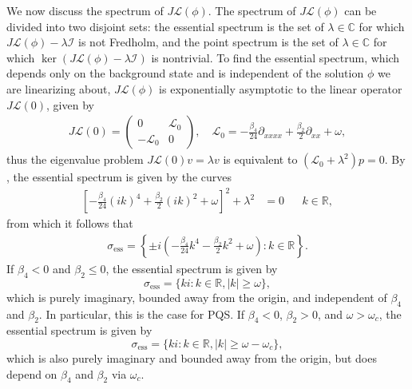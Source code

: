 \documentclass[12pt]{elsarticle}
\def\R{{\mathbb R}}
\def\C{{\mathbb C}}
\def\calL{{\mathcal L}}
\def\calI{{\mathcal I}}
\begin{document}
We now discuss the spectrum of $J \calL(\phi)$. The spectrum of $J \calL(\phi)$ can be divided into two disjoint sets: the essential spectrum is the set of $\lambda \in \C$ for which $J \calL(\phi) - \lambda \calI$ is not Fredholm, and the point spectrum is the set of $\lambda \in \C$ for which $\ker( J \calL(\phi) - \lambda \calI)$ is nontrivial. To find the essential spectrum, which depends only on the background state and is independent of the solution $\phi$ we are linearizing about, $J \calL(\phi)$ is exponentially asymptotic to the linear operator $J \calL(0)$, given by
\begin{align}\label{defL0}
J \calL(0) = 
\begin{pmatrix}
0 & \calL_0 \\
-\calL_0 & 0
\end{pmatrix}, \quad
\calL_0 = -\frac{\beta_4}{24} \partial_{xxxx} + \frac{\beta_2}{2} \partial_{xx} + \omega,
\end{align}
thus the eigenvalue problem $J \calL(0) v = \lambda v$ is equivalent to $(\calL_0 + \lambda^2)p = 0$. By \cite[Theorem 3.1.13]{Kapitula2013}, the essential spectrum is given by the curves
\begin{align*}
\left[ -\frac{\beta_4}{24} (ik)^4 + \frac{\beta_2}{2}(ik)^2 + \omega \right]^2 + \lambda^2 &= 0 && k \in \R,
\end{align*}
from which it follows that
\begin{align*}
\sigma_{\text{ess}} = \left\{ \pm i \left( -\frac{\beta_4}{24}k^4 - \frac{\beta_2}{2}k^2 + \omega \right) : k \in \R \right\}.
\end{align*}
If $\beta_4 < 0$ and $\beta_2 \leq 0$, the essential spectrum is given by 
\begin{equation}\label{PQSessspec}
\sigma_{\text{ess}} = \{ k i : k \in \R, |k| \geq \omega \},
\end{equation}
which is purely imaginary, bounded away from the origin, and independent of $\beta_4$ and $\beta_2$. In particular, this is the case for PQS. If $\beta_4 < 0$, $\beta_2 > 0$, and $\omega > \omega_c$, the essential spectrum is given by 
\begin{equation}\label{essspec2}
\sigma_{\text{ess}} = \{ k i : k \in \R, |k| \geq \omega - \omega_c \},
\end{equation}
which is also purely imaginary and bounded away from the origin, but does depend on $\beta_4$ and $\beta_2$ via $\omega_c$.
\end{document}
